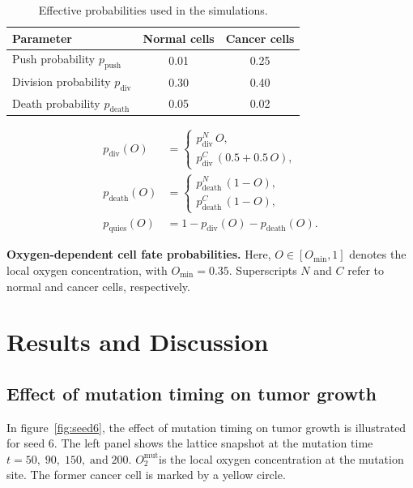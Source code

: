 \documentclass[11pt,a4paper,twoside]{article}
\begin{document}
\begin{table}[H]
\centering
\caption{Effective probabilities used in the simulations.}
\begin{tabular}{lcc}
\toprule
Parameter & Normal cells & Cancer cells \\
\midrule
Push probability $p_{\text{push}}$ & 0.01 & 0.25 \\
Division probability $p_{\text{div}}$ & 0.30 & 0.40 \\
Death probability $p_{\text{death}}$ & 0.05 & 0.02 \\
\bottomrule
\end{tabular}
\label{table:parameters}
\end{table}



\begin{equation}
\begin{aligned}
p_{\mathrm{div}}(O) &=
\begin{cases}
p_{\mathrm{div}}^{N}\, O, \\
p_{\mathrm{div}}^{C}\,(0.5 + 0.5\,O),
\end{cases} \\[6pt]
p_{\mathrm{death}}(O) &=
\begin{cases}
p_{\mathrm{death}}^{N}\,(1 - O), \\
p_{\mathrm{death}}^{C}\,(1 - O),
\end{cases} \\[6pt]
p_{\mathrm{quies}}(O) &= 1 - p_{\mathrm{div}}(O) - p_{\mathrm{death}}(O).
\end{aligned}
\label{eq:oxygen_fate}
\end{equation}

\noindent\textbf{Oxygen-dependent cell fate probabilities.}
Here, $O \in [O_{\min},1]$ denotes the local oxygen concentration, with $O_{\min}=0.35$.
Superscripts $N$ and $C$ refer to normal and cancer cells, respectively.




\section{Results and Discussion}

\subsection{Effect of mutation timing on tumor growth}

In figure~\ref{fig:seed6}, the effect of mutation timing on tumor growth is illustrated for seed 6. 
The left panel shows the lattice snapshot at the mutation time $t = 50,\; 90,\; 150,\; \text{and}\; 200$. 
$O_{2}^{\mathrm{mut}}$is the local oxygen concentration at the mutation site. The former cancer cell is marked by a yellow circle.
\end{document}
